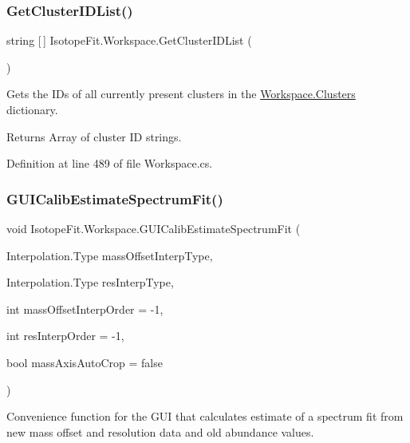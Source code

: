 \subsubsection{\texorpdfstring{Get\+Cluster\+I\+D\+List()}{GetClusterIDList()}}
{\footnotesize\ttfamily string \mbox{[}$\,$\mbox{]} Isotope\+Fit.\+Workspace.\+Get\+Cluster\+I\+D\+List (\begin{DoxyParamCaption}{ }\end{DoxyParamCaption})}



Gets the I\+Ds of all currently present clusters in the \mbox{\hyperlink{class_isotope_fit_1_1_workspace_a13958fbe0adace21990cb1eabbd421e9}{Workspace.\+Clusters}} dictionary. 

\begin{DoxyReturn}{Returns}
Array of cluster ID strings.
\end{DoxyReturn}


Definition at line 489 of file Workspace.\+cs.

\mbox{\label{class_isotope_fit_1_1_workspace_a19d98d4a89b048223e47593d96631d04}} 
\subsubsection{\texorpdfstring{G\+U\+I\+Calib\+Estimate\+Spectrum\+Fit()}{GUICalibEstimateSpectrumFit()}}
{\footnotesize\ttfamily void Isotope\+Fit.\+Workspace.\+G\+U\+I\+Calib\+Estimate\+Spectrum\+Fit (\begin{DoxyParamCaption}\item[{Interpolation.\+Type}]{mass\+Offset\+Interp\+Type,  }\item[{Interpolation.\+Type}]{res\+Interp\+Type,  }\item[{int}]{mass\+Offset\+Interp\+Order = {\ttfamily -\/1},  }\item[{int}]{res\+Interp\+Order = {\ttfamily -\/1},  }\item[{bool}]{mass\+Axis\+Auto\+Crop = {\ttfamily false} }\end{DoxyParamCaption})}



Convenience function for the G\+UI that calculates estimate of a spectrum fit from new mass offset and resolution data and old abundance values. 


